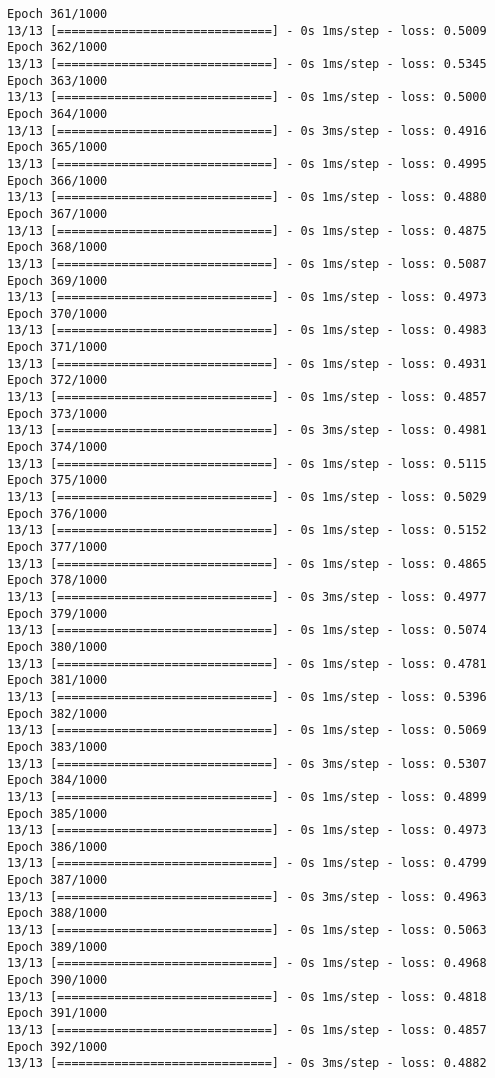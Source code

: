 \documentclass[11pt]{article}
\begin{document}
\begin{Verbatim}[commandchars=\\\{\}]
Epoch 361/1000
13/13 [==============================] - 0s 1ms/step - loss: 0.5009
Epoch 362/1000
13/13 [==============================] - 0s 1ms/step - loss: 0.5345
Epoch 363/1000
13/13 [==============================] - 0s 1ms/step - loss: 0.5000
Epoch 364/1000
13/13 [==============================] - 0s 3ms/step - loss: 0.4916
Epoch 365/1000
13/13 [==============================] - 0s 1ms/step - loss: 0.4995
Epoch 366/1000
13/13 [==============================] - 0s 1ms/step - loss: 0.4880
Epoch 367/1000
13/13 [==============================] - 0s 1ms/step - loss: 0.4875
Epoch 368/1000
13/13 [==============================] - 0s 1ms/step - loss: 0.5087
Epoch 369/1000
13/13 [==============================] - 0s 1ms/step - loss: 0.4973
Epoch 370/1000
13/13 [==============================] - 0s 1ms/step - loss: 0.4983
Epoch 371/1000
13/13 [==============================] - 0s 1ms/step - loss: 0.4931
Epoch 372/1000
13/13 [==============================] - 0s 1ms/step - loss: 0.4857
Epoch 373/1000
13/13 [==============================] - 0s 3ms/step - loss: 0.4981
Epoch 374/1000
13/13 [==============================] - 0s 1ms/step - loss: 0.5115
Epoch 375/1000
13/13 [==============================] - 0s 1ms/step - loss: 0.5029
Epoch 376/1000
13/13 [==============================] - 0s 1ms/step - loss: 0.5152
Epoch 377/1000
13/13 [==============================] - 0s 1ms/step - loss: 0.4865
Epoch 378/1000
13/13 [==============================] - 0s 3ms/step - loss: 0.4977
Epoch 379/1000
13/13 [==============================] - 0s 1ms/step - loss: 0.5074
Epoch 380/1000
13/13 [==============================] - 0s 1ms/step - loss: 0.4781
Epoch 381/1000
13/13 [==============================] - 0s 1ms/step - loss: 0.5396
Epoch 382/1000
13/13 [==============================] - 0s 1ms/step - loss: 0.5069
Epoch 383/1000
13/13 [==============================] - 0s 3ms/step - loss: 0.5307
Epoch 384/1000
13/13 [==============================] - 0s 1ms/step - loss: 0.4899
Epoch 385/1000
13/13 [==============================] - 0s 1ms/step - loss: 0.4973
Epoch 386/1000
13/13 [==============================] - 0s 1ms/step - loss: 0.4799
Epoch 387/1000
13/13 [==============================] - 0s 3ms/step - loss: 0.4963
Epoch 388/1000
13/13 [==============================] - 0s 1ms/step - loss: 0.5063
Epoch 389/1000
13/13 [==============================] - 0s 1ms/step - loss: 0.4968
Epoch 390/1000
13/13 [==============================] - 0s 1ms/step - loss: 0.4818
Epoch 391/1000
13/13 [==============================] - 0s 1ms/step - loss: 0.4857
Epoch 392/1000
13/13 [==============================] - 0s 3ms/step - loss: 0.4882

\end{Verbatim}
\end{document}
